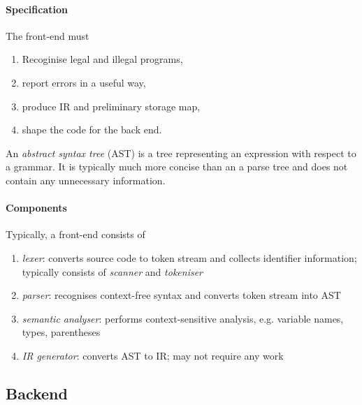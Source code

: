 \documentclass{article}
\begin{document}
\paragraph{Specification} The front-end must 
\begin{enumerate}
    \item Recoginise legal and illegal programs,
    \item report errors in a useful way,
    \item produce IR and preliminary storage map,
    \item shape the code for the back end.
\end{enumerate}

\begin{definition}
    An \emph{abstract syntax tree} (AST) is a tree representing an expression with
    respect to a grammar. It is typically much more concise than an a parse tree and 
    does not contain any unnecessary information.
\end{definition}

\paragraph{Components} Typically, a front-end consists of 
\begin{enumerate}
    \item \emph{lexer}: converts source code to token stream and collects identifier 
        information; typically consists of \emph{scanner} and \emph{tokeniser}
    \item \emph{parser}: recognises context-free syntax and converts token stream
        into AST
    \item \emph{semantic analyser}: performs context-sensitive analysis, e.g. variable names, types, parentheses
    \item \emph{IR generator}: converts AST to IR; may not require any work
\end{enumerate}

\subsection{Backend}
\begin{center}
\end{center}
\end{document}
